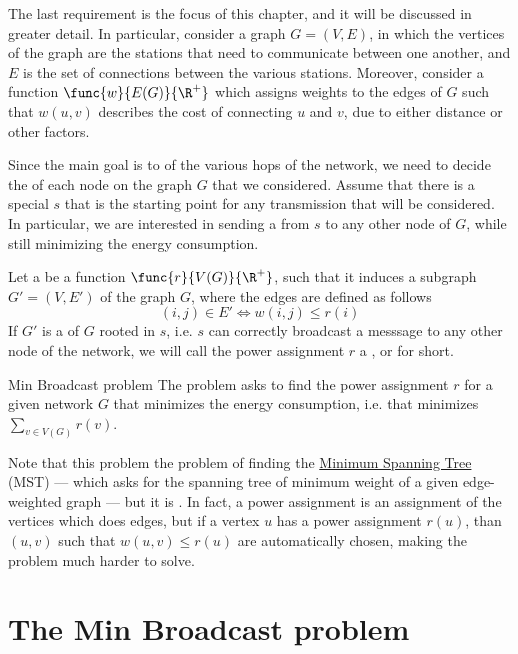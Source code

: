 \documentclass[a4paper, 12pt]{report}
\begin{document}
    The last requirement is the focus of this chapter, and it will be discussed in greater detail. In particular, consider a graph $G = (V, E)$, in which the vertices of the graph are the stations that need to communicate between one another, and $E$ is the set of connections between the various stations. Moreover, consider a function $\func{w}{E(G)}{\R^+}$ which assigns weights to the edges of $G$ such that $w(u, v)$ describes the cost of connecting $u$ and $v$, due to either distance or other factors.

    Since the main goal is to  of the various hops of the network, we need to decide the  of each node on the graph $G$ that we considered. Assume that there is a special  $s$ that is the starting point for any transmission that will be considered. In particular, we are interested in sending a  from $s$ to any other node of $G$, while still minimizing the energy consumption.

    Let a  be a function $\func{r}{V(G)}{\R^+}$, such that it induces a subgraph $G'= (V, E')$ of the graph $G$, where the edges are defined as follows $$(i, j) \in E' \iff w(i, j) \le r(i)$$ If $G'$ is a  of $G$ rooted in $s$, i.e. $s$ can correctly broadcast a messsage to any other node of the network, we will call the power assignment $r$ a , or  for short.

    \begin{frameddefn}{Min Broadcast problem}
        The  problem asks to find the power assignment $r$ for a given network $G$ that minimizes the energy consumption, i.e. that minimizes $\sum_{v \in V(G)}{r(v)}$.
    \end{frameddefn}

    Note that this problem  the problem of finding the \href{https://en.wikipedia.org/wiki/Minimum_spanning_tree}{Minimum Spanning Tree} (MST) --- which asks for the spanning tree of minimum weight of a given edge-weighted graph --- but it is . In fact, a power assignment is an assignment of the vertices which does  edges, but if a vertex $u$ has a power assignment $r(u)$, than  $(u, v)$ such that $w(u, v) \le r(u)$ are automatically chosen, making the problem much harder to solve.

    \section{The Min Broadcast problem}
\end{document}
